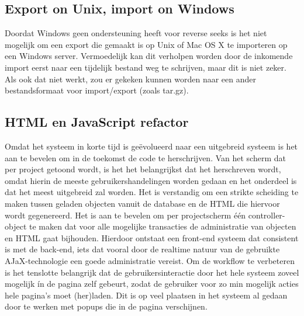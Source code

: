 \subsection{Export on Unix, import on Windows}
Doordat Windows geen ondersteuning heeft voor reverse seeks is het niet mogelijk om een export die gemaakt is op Unix of Mac OS X te importeren op een Windows server. Vermoedelijk kan dit verholpen worden door de inkomende import eerst naar een tijdelijk bestand weg te schrijven, maar dit is niet zeker. Als ook dat niet werkt, zou er gekeken kunnen worden naar een ander bestandsformaat voor import/export (zoals tar.gz).

\subsection{HTML en JavaScript refactor}
\label{html_javascript_refactor}
Omdat het systeem in korte tijd is ge\"evolueerd naar een uitgebreid systeem is het aan te bevelen om in de toekomst de code te herschrijven.
Van het scherm dat per project getoond wordt, is het het belangrijkst dat het herschreven wordt, omdat hierin de meeste gebruikershandelingen worden gedaan en het onderdeel is dat het meest uitgebreid zal worden.
Het is verstandig om een strikte scheiding te maken tussen geladen objecten vanuit de database en de HTML die hiervoor wordt gegenereerd.
Het is aan te bevelen om per projectscherm \'{e}\'{e}n controller-object te maken dat voor alle mogelijke transacties de administratie van objecten en HTML gaat bijhouden.
Hierdoor ontstaat een front-end systeem dat consistent is met de back-end, iets dat vooral door de realtime natuur van de gebruikte AJaX-technologie een goede administratie vereist.
Om de workflow te verbeteren is het tenslotte belangrijk dat de gebruikersinteractie door het hele systeem zoveel mogelijk \'in de pagina zelf gebeurt, zodat de gebruiker voor zo min mogelijk acties hele pagina's moet (her)laden.
Dit is op veel plaatsen in het systeem al gedaan door te werken met popups die in de pagina verschijnen.
